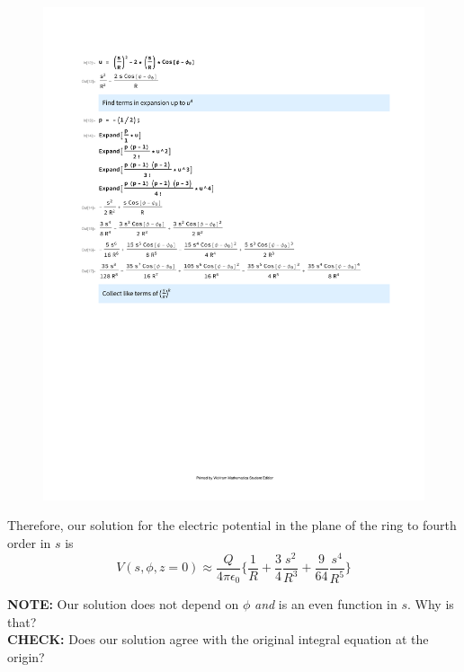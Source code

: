 \documentclass[a4paper, 11pt]{article}
\newenvironment{solution}{%
	\begin{list}{}{%
			\setlength{\topsep}{0pt}%
			\setlength{\leftmargin}{0.5cm}%
			\setlength{\rightmargin}{0.5cm}%
			\setlength{\listparindent}{\parindent}%
			\setlength{\itemindent}{\parindent}%
			\setlength{\parsep}{\parskip}%
		}%
		\item[]}{\end{list}}
\begin{document}
\begin{solution}
  \begin{figure}[!hbt]
    \centering
    \includegraphics[width=1.0\columnwidth]{mathematica_integral}
  \end{figure}

  \newpage
  
  \noindent Therefore, our solution for the electric potential in the plane of the ring to
  fourth order in $s$ is
  \begin{equation}
    V(s,\phi,z=0) \approx \frac{Q}{4\pi\epsilon_0}\Bigg\{  \frac{1}{R} + \frac{3}{4} \frac{s^2}{R^3}+\frac{9}{64} \frac{s^4}{R^5} \Bigg\} 
  \end{equation}
  

  \vspace{2em}
  
  \noindent\textbf{NOTE:} Our solution does not depend on $\phi$ \textit{and}  is an even function in $s$. Why is that? \\

  \noindent\textbf{CHECK:} Does our solution agree with the original integral equation at
  the origin? 
  
\end{solution}
\end{document}
